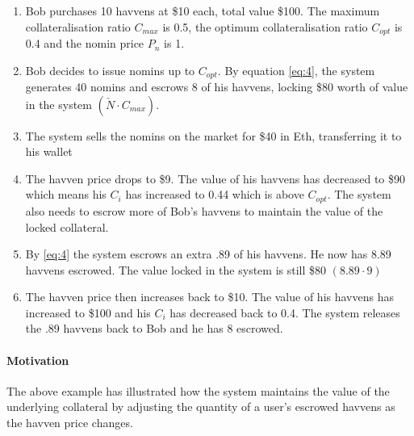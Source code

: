 \begin{enumerate}
\item{Bob purchases 10 havvens at \$10 each, total value \$100. The maximum collateralisation ratio $C_{max}$ is 0.5, the optimum collateralisation ratio $C_{opt}$ is 0.4 and the nomin price $P_n$ is 1.}
\item{Bob decides to issue nomins up to $C_{opt}$. By equation \eqref{eq:4}, the system generates 40 nomins and escrows 8 of his havvens, locking \$80 worth of value in the system $ (\check{N} \cdot C_{max})$.}
\item{The system sells the nomins on the market for \$40 in Eth, transferring it to his wallet}
\item{The havven price drops to \$9. The value of his havvens has decreased to \$90 which means his $C_i$ has increased to 0.44 which is above $C_{opt}$. The system also needs to escrow more of Bob's havvens to maintain the value of the locked collateral.}
\item{By \eqref{eq:4} the system escrows an extra .89 of his havvens. He now has 8.89 havvens escrowed. The value locked in the system is still \$80 $(8.89 \cdot 9)$}
\item{The havven price then increases back to \$10. The value of his havvens has increased to \$100 and his $C_i$ has decreased back to 0.4. The system releases the .89 havvens back to Bob and he has 8 escrowed.}
\end{enumerate}

\paragraph{Motivation} The above example has illustrated how the system maintains the value of the underlying collateral by adjusting the quantity of a user's escrowed havvens as the havven price changes.




